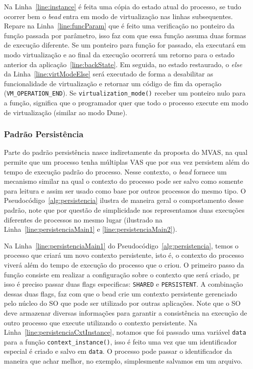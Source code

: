 Na Linha~\ref{line:instance} é feita uma cópia do estado atual do processo, se tudo ocorrer bem o \emph{bead} entra em modo de virtualização nas linhas subsequentes. Repare na Linha~\ref{line:funcParam} que é feito uma verificação no ponteiro da função passada por parâmetro, isso faz com que essa função assuma duas formas de execução diferente. Se um ponteiro para função for passado, ela executará em modo virtualização e ao final da execução ocorrerá um retorno para o estado anterior da aplicação~\ref{line:backState}. Em seguida, no estado restaurado, o \emph{else} da Linha~\ref{line:virtModeElse} será executado de forma a desabilitar as funcionalidade de virtualização e retornar um código de fim da operação (\texttt{VM\_OPERATION\_END}). Se \texttt{virtualization\_mode()} receber um ponteiro nulo para a função, significa que o programador quer que todo o processo execute em modo de virtualização (similar ao modo Dune).

\subsubsection{Padrão Persistência}

Parte do padrão persistência nasce indiretamente da proposta do MVAS, na qual permite que um processo tenha múltiplas VAS que por sua vez persistem além do tempo de execução padrão do processo. Nesse contexto, o \emph{bead} fornece um mecanismo similar na qual o contexto do processo pode ser salvo como somente para leitura e assim ser usado como base por outros processos do mesmo tipo. O Pseudocódigo~\ref{alg:persistencia} ilustra de maneira geral o comportamento desse padrão, note que por questão de simplicidade nos representamos duas execuções diferentes de processos no mesmo lugar (ilustrado na Linha~\ref{line:persistenciaMain1} e \ref{line:persistenciaMain2}).



Na Linha~\ref{line:persistenciaMain1} do Pseudocódigo~\ref{alg:persistencia}, temos o processo que criará um novo contexto persistente, isto é, o contexto do processo viverá além do tempo de execução do processo que o criou. O primeiro passo da função consiste em realizar a configuração sobre o contexto que será criado, pr isso é preciso passar duas flags especificas: \texttt{SHARED} e \texttt{PERSISTENT}. A combinação dessas duas flags, faz com que o bead crie um contexto persistente gerenciado pelo núcleo do SO que pode ser utilizado por outras aplicações. Note que o SO deve armazenar diversas informações para garantir a consistência na execução de outro processo que execute utilizando o contexto persistente. Na Linha~\ref{line:persistenciaCxtInstance}, notamos que foi passado uma variável \texttt{data} para a função \texttt{context\_instance()}, isso é feito uma vez que um identificador especial é criado e salvo em \texttt{data}. O processo pode passar o identificador da maneira que achar melhor, no exemplo, simplesmente salvamos em um arquivo.


